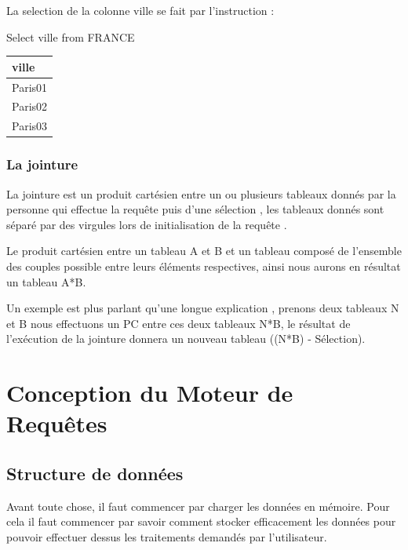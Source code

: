 \documentclass[oneside,13pt,a4paper]{report}
\begin{document}
         La selection de la colonne ville se fait par l'instruction :

         Select ville from FRANCE



         \begin{tabular}{|l|}
          \hline
          ville
          \\
          \hline
          Paris01 \\
          Paris02 \\
          Paris03  \\
          \hline


         \end{tabular}
        \subsection{La jointure}

            La jointure est un produit cartésien entre un ou plusieurs tableaux donnés par la personne qui effectue la requête puis d'une sélection , les tableaux donnés sont séparé par des virgules lors de initialisation de la requête .

            Le produit cartésien entre un tableau A et B et un tableau composé de l'ensemble des couples possible entre leurs éléments respectives, ainsi nous aurons en résultat un tableau A*B.

	          Un exemple est plus parlant qu'une longue explication , prenons deux tableaux N et B nous effectuons un PC entre ces deux tableaux N*B, le résultat de l’exécution de la jointure donnera un nouveau tableau ((N*B) - Sélection).


    \chapter{Conception du Moteur de Requêtes}

        \section{Structure de données}
            Avant toute chose, il faut commencer par charger les données en mémoire. Pour cela il faut commencer par savoir comment stocker efficacement les données pour pouvoir effectuer dessus les traitements demandés par l’utilisateur.
\end{document}
